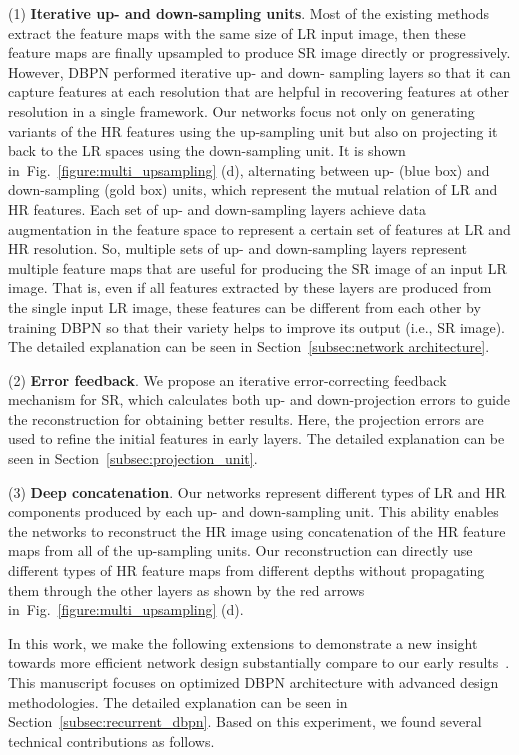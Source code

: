 \documentclass[10pt,journal,compsoc]{IEEEtran}
\begin{document}
\noindent(1) \textbf{Iterative up- and down-sampling units}. 
Most of the existing methods extract the feature maps with the same size of LR input image, then these feature maps are finally upsampled to produce SR image directly or progressively.
 However, DBPN performed iterative up- and down- sampling layers so that it can capture features at each resolution that are helpful in recovering features at other resolution in a single framework. 
Our networks focus not only on generating variants of the HR features using the up-sampling unit but also on projecting it back to the LR spaces using the down-sampling unit. 
It is shown in~Fig.~\ref{figure:multi_upsampling} (d), alternating between up- (blue box) and down-sampling (gold box) units, which represent the mutual relation of LR and HR features. 
Each set of up- and down-sampling layers achieve data augmentation in the feature space to represent a certain set of features at LR and HR resolution. So, multiple sets of up- and down-sampling layers represent multiple feature maps that are useful for producing the SR image of an input LR image. That is, even if all features extracted by these layers are produced from the single input LR image, these features can be different from each other by training DBPN so that their variety helps to improve its output (i.e., SR image). The detailed explanation can be seen in Section~\ref{subsec:network architecture}.


\noindent(2) \textbf{Error feedback}. We propose an iterative
error-correcting feedback mechanism for SR, which calculates both up- and down-projection errors to guide the reconstruction for obtaining better results. 
Here, the projection errors are used to refine the initial features in early layers. 
The detailed explanation can be seen in Section~\ref{subsec:projection_unit}.

\noindent(3) \textbf{Deep concatenation}. Our networks represent different types of LR and HR components produced by each up- and down-sampling unit. 
This ability enables the networks to reconstruct the HR image using concatenation of the HR feature maps from all of the up-sampling units. 
Our reconstruction can directly use different types of HR feature maps from different depths without propagating them through the other layers as shown by the red arrows in~Fig.~\ref{figure:multi_upsampling} (d).




In this work, we make the following extensions to demonstrate a new insight towards more efficient network design substantially compare to our early results~\cite{haris2018deep}. 
This manuscript focuses on optimized DBPN architecture with advanced design methodologies. 
The detailed explanation can be seen in Section~\ref{subsec:recurrent_dbpn}. 
Based on this experiment, we found several technical contributions as follows.
\end{document}
